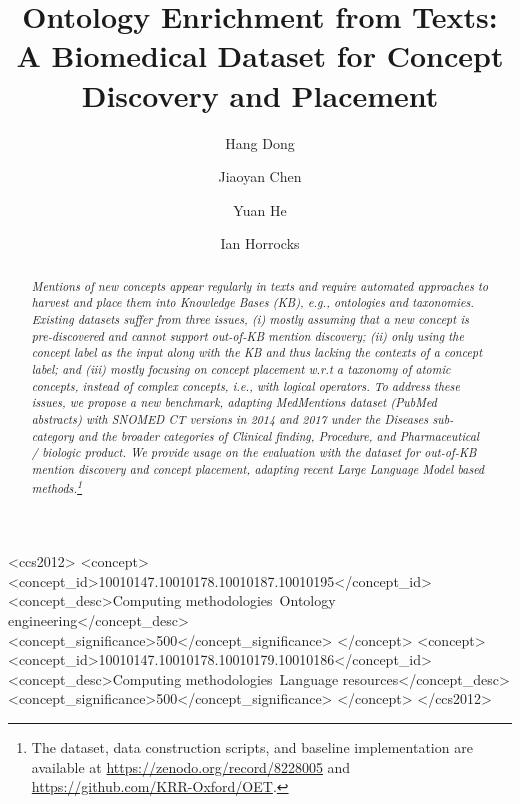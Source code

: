 \documentclass[sigconf]{acmart}
\begin{document}
\title{ 
Ontology Enrichment from Texts: A Biomedical Dataset for Concept Discovery and Placement}

\author{Hang Dong}
	
	\author{Jiaoyan Chen}
	
	\author{Yuan He}
	
	\author{Ian Horrocks}
	
\renewcommand{\shortauthors}{Dong et al.}
 
\begin{abstract}
\noindent\textit{Mentions of new concepts appear regularly in texts and require automated approaches to harvest and place them into Knowledge Bases (KB), e.g., ontologies and taxonomies. Existing datasets suffer from three issues, (i) mostly assuming that a new concept is pre-discovered and cannot support out-of-KB mention discovery; (ii) only using the concept label as the input along with the KB and thus lacking the contexts of a concept label; and (iii) mostly focusing on concept placement w.r.t a taxonomy of atomic concepts, instead of complex concepts, i.e., with logical operators. To address these issues, we propose a new benchmark, adapting MedMentions dataset (PubMed abstracts) with SNOMED CT versions in 2014 and 2017 under the Diseases sub-category and the broader categories of Clinical finding, Procedure, and Pharmaceutical / biologic product. We provide usage on the evaluation with the dataset for out-of-KB mention discovery and concept placement, adapting recent Large Language Model based methods.\footnote{The dataset, data construction scripts, and baseline implementation are available at \url{https://zenodo.org/record/8228005} and \url{https://github.com/KRR-Oxford/OET}.}}
\end{abstract}

\begin{CCSXML}
<ccs2012>
   <concept>
       <concept_id>10010147.10010178.10010187.10010195</concept_id>
       <concept_desc>Computing methodologies~Ontology engineering</concept_desc>
       <concept_significance>500</concept_significance>
       </concept>
   <concept>
       <concept_id>10010147.10010178.10010179.10010186</concept_id>
       <concept_desc>Computing methodologies~Language resources</concept_desc>
       <concept_significance>500</concept_significance>
       </concept>
 </ccs2012>
\end{CCSXML}
\end{document}

